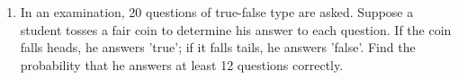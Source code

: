\begin{enumerate}[label=\thechapter.\arabic*,ref=\thechapter.\theenumi]
\item In an examination, 20 questions of true-false type are asked. Suppose a student
	tosses a fair coin to determine his answer to each question. If the coin falls
	heads, he answers 'true'; if it falls tails, he answers 'false'. Find the probability
	that he answers at least 12 questions correctly. 
\end{enumerate}
